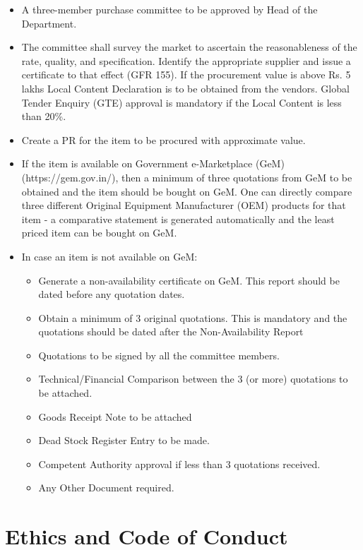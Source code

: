 \documentclass[
  10pt,
  a5paper,
  10pt,
  openany]{amsbook}
\providecommand{\tightlist}{%
  \setlength{\itemsep}{0pt}\setlength{\parskip}{0pt}}
\begin{document}
\begin{itemize}
\tightlist
\item
  A three-member purchase committee to be approved by Head of the
  Department.
\item
  The committee shall survey the market to ascertain the reasonableness
  of the rate, quality, and specification. Identify the appropriate
  supplier and issue a certificate to that effect (GFR 155). If the
  procurement value is above Rs. 5 lakhs Local Content Declaration is to
  be obtained from the vendors. Global Tender Enquiry (GTE) approval is
  mandatory if the Local Content is less than 20\%.
\item
  Create a PR for the item to be procured with approximate value.
\item
  If the item is available on Government e-Marketplace (GeM)
  (https://gem.gov.in/), then a minimum of three quotations from GeM to
  be obtained and the item should be bought on GeM. One can directly
  compare three different Original Equipment Manufacturer (OEM) products
  for that item - a comparative statement is generated automatically and
  the least priced item can be bought on GeM.
\item
  In case an item is not available on GeM:

  \begin{itemize}
  \tightlist
  \item
    Generate a non-availability certificate on GeM. This report should
    be dated before any quotation dates.
  \item
    Obtain a minimum of 3 original quotations. This is mandatory and the
    quotations should be dated after the Non-Availability Report
  \item
    Quotations to be signed by all the committee members.
  \item
    Technical/Financial Comparison between the 3 (or more) quotations to
    be attached.
  \item
    Goods Receipt Note to be attached
  \item
    Dead Stock Register Entry to be made.
  \item
    Competent Authority approval if less than 3 quotations received.
  \item
    Any Other Document required.
  \end{itemize}
\end{itemize}

\chapter{Ethics and Code of Conduct}\label{ethics-and-code-of-conduct}
\end{document}
